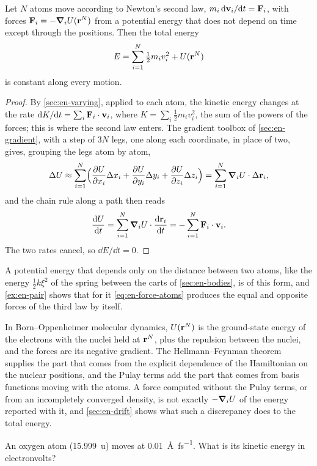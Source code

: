 \begin{proposition}
\label{prop:en-energy-atoms}
Let $N$ atoms move according to Newton's second law, $m_i\,\mathrm{d}\bm{\mathrm{v}}_i/\mathrm{d}
t = \bm{\mathrm{F}}_i$, with forces $\bm{\mathrm{F}}_i = -\bm{\nabla}_i U(\bm{\mathrm{r}}^N)$ from a
potential energy that does not depend on time except through the
positions. Then the total energy
\begin{equation*}
   E = \sum_{i=1}^{N}\tfrac12 m_i v_i^2 + U(\bm{\mathrm{r}}^N)
\end{equation*}
is constant along every motion.
\end{proposition}

\begin{proof}
By \cref{sec:en-varying}, applied to each atom, the kinetic energy changes
at the rate $\mathrm{d} K/\mathrm{d} t = \sum_i\bm{\mathrm{F}}_i\cdot\bm{\mathrm{v}}_i$, where $K =
\sum_i\frac12 m_i v_i^2$, the sum of the
powers of the forces; this is where the second law enters. The gradient
toolbox of \cref{sec:en-gradient}, with a step of $3N$ legs, one along
each coordinate, in place of two, gives, grouping the legs atom by atom,
\begin{equation*}
   \Delta U \approx \sum_{i=1}^{N}\Bigl(\frac{\partial U}{\partial x_i}
   \Delta x_i + \frac{\partial U}{\partial y_i}\Delta y_i
   + \frac{\partial U}{\partial z_i}\Delta z_i\Bigr)
   = \sum_{i=1}^{N}\bm{\nabla}_i U\cdot\Delta\bm{\mathrm{r}}_i ,
\end{equation*}
and the chain rule along a path then reads
\begin{equation*}
   \frac{\mathrm{d} U}{\mathrm{d} t} = \sum_{i=1}^{N}\bm{\nabla}_i U\cdot\frac{\mathrm{d}\bm{\mathrm{r}}_i}{\mathrm{d}
   t} = -\sum_{i=1}^{N}\bm{\mathrm{F}}_i\cdot\bm{\mathrm{v}}_i .
\end{equation*}
The two rates cancel, so $\dd E/\dd t = 0$.
\end{proof}

A potential energy that depends only on the distance between two atoms,
like the energy $\frac12 k\xi^2$ of the spring between the carts of
\cref{sec:en-bodies}, is of this form, and \cref{ex:en-pair} shows that
for it \cref{eq:en-force-atoms}
produces the equal and opposite forces of the third law by itself.

\begin{bridge}
In Born--Oppenheimer molecular dynamics, $U(\bm{\mathrm{r}}^N)$ is the
ground-state energy of the electrons with the nuclei held at $\bm{\mathrm{r}}^N$,
plus the repulsion between the nuclei, and the forces are its negative
gradient. The Hellmann--Feynman theorem supplies the part that comes from
the explicit dependence of the Hamiltonian on the nuclear positions, and
the Pulay terms add the part that comes from basis functions moving with
the atoms. A force computed without the Pulay terms, or from an
incompletely converged density, is not exactly $-\bm{\nabla}_i U$ of the energy
reported with it, and \cref{sec:en-drift} shows what such a discrepancy
does to the total energy.
\end{bridge}

\begin{selfcheck}
An oxygen atom (\SI{15.999}{\amu}) moves at
\SI{0.01}{\angstrom\per\femto\second}. What is its kinetic energy in
electronvolts?
\end{selfcheck}
